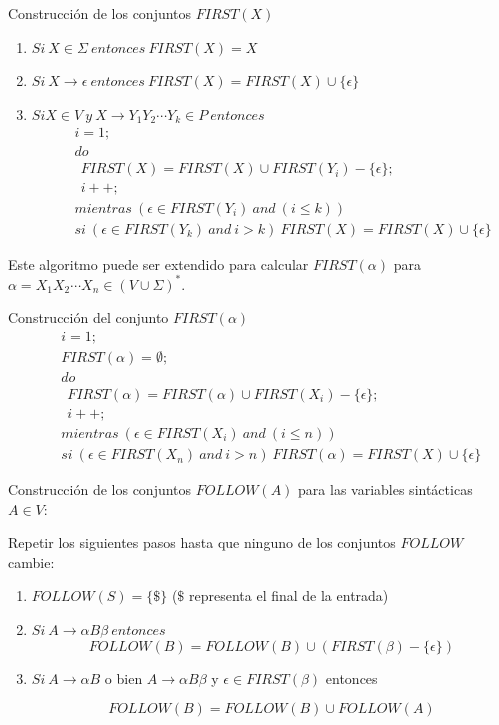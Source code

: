 \begin{algorithm} Construcción de los conjuntos $FIRST(X)$
\begin{enumerate}
\item
$Si\ X \in \Sigma\ entonces\ FIRST(X) = {X}$
\item
$Si\ X \rightarrow \epsilon\ entonces\ FIRST(X) =  FIRST(X) \cup \{ \epsilon \}$
\item
$Si X \in V \ y\ X \rightarrow Y_1 Y_2 \cdots Y_k \in P\ entonces$
\begin{eqnarray*}
&&i = 1; \\
&&do\\
&&\ \ FIRST(X) = FIRST(X) \cup FIRST(Y_i) - \{ \epsilon \};\\
&&\ \ i++;\\
&&mientras\ (\epsilon \in FIRST(Y_i)\ and\ (i \leq k))\\
&&si\ (\epsilon \in FIRST(Y_k)\ and\ i > k)\ FIRST(X) = FIRST(X) \cup \{ \epsilon \}
\end{eqnarray*}
\end{enumerate}
\end{algorithm}
Este algoritmo puede ser extendido para calcular $FIRST(\alpha)$ para $\alpha = X_1 X_2 \cdots X_n \in (V \cup \Sigma)^*$.

\begin{algorithm} Construcción del conjunto $FIRST(\alpha)$ 
\begin{eqnarray*}
&&i = 1; \nonumber\\
&&FIRST(\alpha) = \emptyset; \nonumber\\
&&do \nonumber\\
&&\ \ FIRST(\alpha) = FIRST(\alpha) \cup FIRST(X_i) - \{ \epsilon \}; \nonumber\\
&&\ \ i++; \nonumber\\
&&mientras\ (\epsilon \in FIRST(X_i)\ and\ (i \leq n)) \nonumber\\
&&si\ (\epsilon \in FIRST(X_n)\ and\ i > n)\ FIRST(\alpha) = FIRST(X) \cup \{ \epsilon \}
\end{eqnarray*}
\end{algorithm} 

\begin{algorithm} Construcción de los conjuntos $FOLLOW(A)$
para las variables sintácticas $A \in V$: 

Repetir los siguientes pasos hasta que ninguno de los conjuntos $FOLLOW$ cambie:
\begin{enumerate} 
\item 
$FOLLOW(S) = \{\$\} $  ($\$$ representa el final de la entrada)
\item
$Si\ A \rightarrow \alpha B \beta\ entonces$
\[ FOLLOW(B) =  FOLLOW(B) \cup (FIRST(\beta) - \{\epsilon\})\]
\item
$Si\ A \rightarrow \alpha B$ o bien $A \rightarrow \alpha B \beta$
y $\epsilon \in FIRST(\beta)$  entonces

\[ FOLLOW(B) = FOLLOW(B) \cup FOLLOW(A)\]
\end{enumerate}
\end{algorithm}

